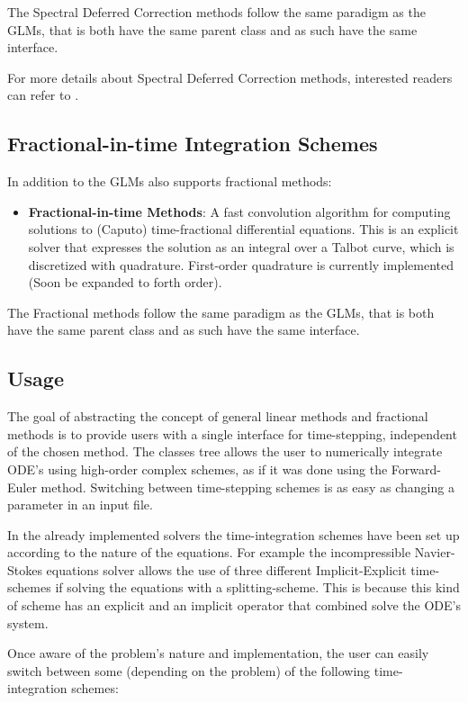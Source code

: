 The Spectral Deferred Correction methods follow the same paradigm as the 
GLMs, that is both have the same parent class and as such have the same 
interface.

For more details about Spectral Deferred Correction methods, interested
readers can refer to \cite{Dutt2000, Minion2003, Ketcheson2014}.

\subsection{Fractional-in-time Integration Schemes}

In addition to the GLMs {\nek} also supports fractional methods:
\begin{itemize}
  \item \textbf{Fractional-in-time Methods}: A fast convolution
    algorithm for computing solutions to (Caputo) time-fractional
    differential equations. This is an explicit solver that expresses
    the solution as an integral over a Talbot curve, which is
    discretized with quadrature. First-order quadrature is currently
    implemented (Soon be expanded to forth order).
\end{itemize}

The Fractional methods follow the same paradigm as the GLMs, that is
both have the same parent class and as such have the same interface.

\subsection{Usage}
The goal of abstracting the concept of general linear methods and
fractional methods is to provide users with a single interface for
time-stepping, independent of the chosen method. The classes tree
allows the user to numerically integrate ODE's using high-order
complex schemes, as if it was done using the Forward-Euler method.
Switching between time-stepping schemes is as easy as changing a
parameter in an input file.

In the already implemented solvers the time-integration schemes have
been set up according to the nature of the equations.  For example the
incompressible Navier-Stokes equations solver allows the use of three
different Implicit-Explicit time-schemes if solving the equations with
a splitting-scheme.  This is because this kind of scheme has an
explicit and an implicit operator that combined solve the ODE's
system.

Once aware of the problem's nature and implementation, the user can
easily switch between some (depending on the problem) of the following
time-integration schemes:

